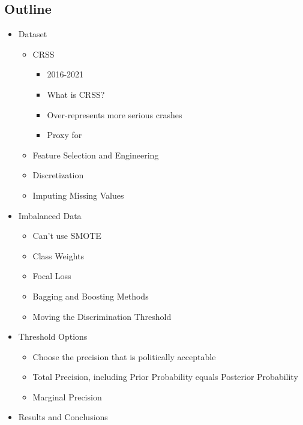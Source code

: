 
\subsection{Outline}

\begin{itemize}

	\item Dataset
	\begin{itemize}
		\item CRSS
		\begin{itemize}
			\item 2016-2021
			\item What is CRSS?
			\item Over-represents more serious crashes
			\item Proxy for 
		\end{itemize}
		\item Feature Selection and Engineering
		\item Discretization
		\item Imputing Missing Values
	\end{itemize}
	
	\item Imbalanced Data
	\begin{itemize}
		\item Can't use SMOTE
		\item Class Weights
		\item Focal Loss
		\item Bagging and Boosting Methods
		\item Moving the Discrimination Threshold
	\end{itemize}
	
	\item Threshold Options
	\begin{itemize}
		\item Choose the precision that is politically acceptable
		\item Total Precision, including Prior Probability equals Posterior Probability
		\item Marginal Precision
	\end{itemize}
	
	\item Results and Conclusions
	
\end{itemize}
